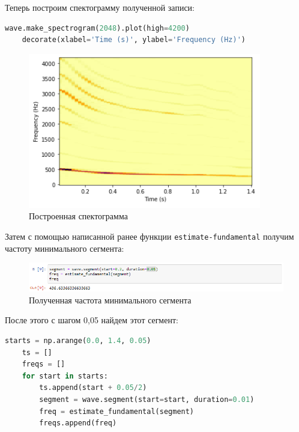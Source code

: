 \documentclass[a4paper]{article}
\begin{document}
            Теперь построим спектограмму полученной записи:
            
\begin{lstlisting}[language=Python, caption= Построение спектограммы]
    wave.make_spectrogram(2048).plot(high=4200)
    decorate(xlabel='Time (s)', ylabel='Frequency (Hz)')
\end{lstlisting}               
            
            \begin{figure}[H]
                \centering
                \includegraphics{ex_2_spectogramma.png}
                \caption{Построенная спектограмма}
                \label{fig:ex_2_spectogramma}
            \end{figure}
            
            Затем с помощью написанной ранее функции \texttt{estimate-fundamental} получим частоту минимального сегмента:
            
            \begin{figure}[H]
                \centering
                \includegraphics[width=\textwidth]{ex_2_freq.png}
                \caption{Полученная частота минимального сегмента}
                \label{fig:ex_2_audio}
            \end{figure}
            
            После этого с шагом 0,05 найдем этот сегмент:
            
\begin{lstlisting}[language=Python, caption= Нахождение нужного сегмента]
    starts = np.arange(0.0, 1.4, 0.05)
    ts = []
    freqs = []
    for start in starts:
        ts.append(start + 0.05/2)
        segment = wave.segment(start=start, duration=0.01)
        freq = estimate_fundamental(segment)
        freqs.append(freq)
\end{lstlisting} 
            
\end{document}
